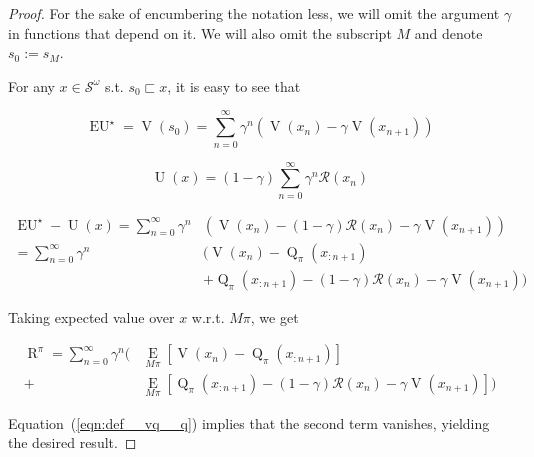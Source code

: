 \documentclass[anon,12pt]{colt2018} %
\newcommand{\AP}[1]{\left(#1\right)}
\newcommand{\AB}[1]{\left[#1\right]}
\newcommand{\Ea}[2]{\underset{#1}{\operatorname{E}}\AB{#2}}
\newcommand{\St}{\mathcal{S}}
\newcommand{\R}{\mathcal{R}}
\newcommand{\Ut}{\operatorname{U}}
\newcommand{\V}{\operatorname{V}}
\newcommand{\Q}{\operatorname{Q}}
\newcommand{\EU}{\operatorname{EU}}
\newcommand{\Rg}{\operatorname{R}}
\begin{document}
\begin{proof}

For the sake of encumbering the notation less, we will omit the argument $\gamma$ in functions that depend on it. We will also omit the subscript $M$ and denote $s_0:=s_M$.

For any $x \in \St^\omega$ s.t. $s_0 \sqsubset x$, it is easy to see that

$$\EU^{\star}=\V\AP{s_0}=\sum_{n=0}^\infty \gamma^n \AP{\V\AP{x_{n}}-\gamma\V\AP{x_{n+1}}}$$

$$\Ut(x)=(1-\gamma)\sum_{n=0}^\infty \gamma^n \R\AP{x_{n}}$$

\begin{align*}
\EU^{\star} - \Ut(x)=\sum_{n=0}^\infty \gamma^n &\AP{\V\AP{x_{n}}-(1-\gamma)\R\AP{x_{n}}-\gamma\V\AP{x_{n+1}}} \\ =\sum_{n=0}^\infty \gamma^n &\Big(\V\AP{x_{n}}-\Q_\pi\AP{x_{:n+1}}
\\ &+\Q_\pi\AP{x_{:n+1}}-(1-\gamma)\R\AP{x_{n}}-\gamma\V\AP{x_{n+1}}\Big)
\end{align*}

Taking expected value over $x$ w.r.t. $M\pi$, we get

\begin{align*}
\Rg^{\pi}=\sum_{n=0}^\infty \gamma^n \Bigg(&\Ea{M\pi}{\V\AP{x_{n}}-\Q_\pi\AP{x_{:n+1}}} \\ 
+&\Ea{M\pi}{\Q_\pi\AP{x_{:n+1}}-(1-\gamma)\R\AP{x_{n}}-\gamma\V\AP{x_{n+1}}}\Bigg)
\end{align*}

Equation~(\ref{eqn:def__vq__q}) implies that the second term vanishes, yielding the desired result.
\end{proof}
\end{document}
